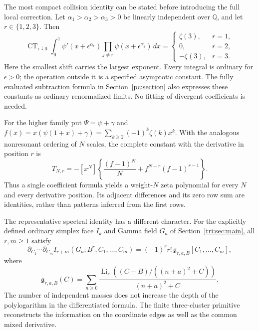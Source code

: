 \documentclass[11pt,a4paper]{article}
\theoremstyle{definition}
\theoremstyle{remark}
\numberwithin{equation}{section}
\newcommand{\CT}{\operatorname{CT}}
\begin{document}
The most compact collision identity can be stated before introducing
the full local correction. Let $\alpha_1>\alpha_2>\alpha_3>0$ be
linearly independent over $\mathbb Q$, and let $r\in\{1,2,3\}$.
Then
\begin{equation}\label{intro:triple}
\boxed{\displaystyle
\CT_{\epsilon\downarrow0}\int_0^1
 \psi'(x+\epsilon^{\alpha_r})
 \prod_{j\ne r}\psi(x+\epsilon^{\alpha_j})\,dx
 =\begin{cases}
  \zeta(3),&r=1,\\
  0,&r=2,\\
  -\zeta(3),&r=3.
 \end{cases}}
\end{equation}
Here the smallest shift carries the largest exponent. Every integral
is ordinary for $\epsilon>0$; the operation outside it is a specified
asymptotic constant. The fully evaluated subtraction formula in
Section~\ref{pc:section} also expresses these constants as ordinary
renormalized limits. No fitting of divergent coefficients is needed.

For the higher family put $\Psi=\psi+\gamma$ and
$f(x)=x(\psi(1+x)+\gamma)=\sum_{k\ge2}(-1)^k\zeta(k)x^k$.
With the analogous nonresonant ordering of $N$ scales, the complete
constant with the derivative in position $r$ is
\begin{equation}\label{intro:allN}
\boxed{\displaystyle
T_{N,r}=-[x^N]\left\{\frac{(f-1)^N}{N}
                     +f^{N-r}(f-1)^{r-1}\right\}.}
\end{equation}
Thus a single coefficient formula yields a weight-$N$ zeta polynomial
for every $N$ and every derivative position. Its adjacent differences
and its zero row sum are identities, rather than patterns inferred from
the first rows.

The representative spectral identity has a different character. For
the explicitly defined ordinary simplex face $I_k$ and Gamma field $G_a$
of Section~\ref{tri:sec:main}, all $r,m\ge1$ satisfy
\begin{equation}\label{intro:mixed}
\partial_{C_1}\cdots\partial_{C_m}
 I_{r+m}(G_a;B^r,C_1,\ldots,C_m)
 =(-1)^r r!\,\mathfrak g_{r,a,B}[C_1,\ldots,C_m],
\end{equation}
where
\[
\mathfrak g_{r,a,B}(C)=\sum_{n\ge0}
 \frac{\operatorname{Li}_r((C-B)/((n+a)^2+C))}{(n+a)^2+C}.
\]
The number of independent masses does not increase the depth of the
polylogarithm in the differentiated formula. The finite three-cluster
primitive reconstructs the information on the coordinate edges as well
as the common mixed derivative.
\end{document}
